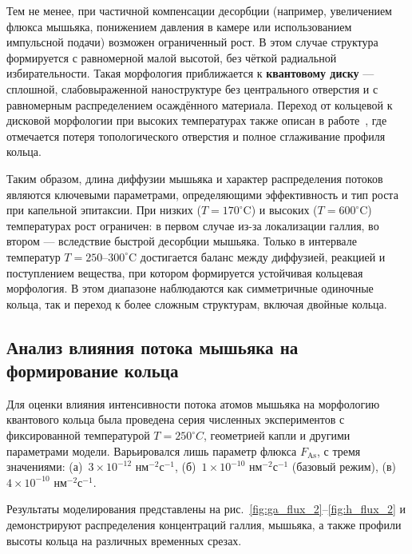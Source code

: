 \documentclass[14pt,oneside]{extarticle}
\begin{document}
Тем не менее, при частичной компенсации десорбции (например, увеличением флюкса мышьяка, понижением давления в камере или использованием импульсной подачи) возможен ограниченный рост. В этом случае структура формируется с равномерной малой высотой, без чёткой радиальной избирательности. Такая морфология приближается к \textbf{квантовому диску} — сплошной, слабовыраженной наноструктуре без центрального отверстия и с равномерным распределением осаждённого материала. Переход от кольцевой к дисковой морфологии при высоких температурах также описан в работе~\cite{fan2023evaporation}, где отмечается потеря топологического отверстия и полное сглаживание профиля кольца.

Таким образом, длина диффузии мышьяка и характер распределения потоков являются ключевыми параметрами, определяющими эффективность и тип роста при капельной эпитаксии. При низких ($T = 170^\circ$C) и высоких ($T = 600^\circ$C) температурах рост ограничен: в первом случае из-за локализации галлия, во втором — вследствие быстрой десорбции мышьяка. Только в интервале температур $T = 250$–$300^\circ$C достигается баланс между диффузией, реакцией и поступлением вещества, при котором формируется устойчивая кольцевая морфология. В этом диапазоне наблюдаются как симметричные одиночные кольца, так и переход к более сложным структурам, включая двойные кольца.

\subsection{Анализ влияния потока мышьяка на формирование кольца}

Для оценки влияния интенсивности потока атомов мышьяка на морфологию квантового кольца была проведена серия численных экспериментов с фиксированной температурой \(T = 250^\circ C\), геометрией капли и другими параметрами модели. Варьировался лишь параметр флюкса \( F_{\text{As}} \), с тремя значениями: (а)~\(3 \times 10^{-12}\) нм$^{-2}$с$^{-1}$, (б)~\(1 \times 10^{-10}\) нм$^{-2}$с$^{-1}$ (базовый режим), (в)~\(4 \times 10^{-10}\) нм$^{-2}$с$^{-1}$.

Результаты моделирования представлены на рис.~\ref{fig:ga_flux_2}–\ref{fig:h_flux_2} и демонстрируют распределения концентраций галлия, мышьяка, а также профили высоты кольца на различных временных срезах.
\end{document}
